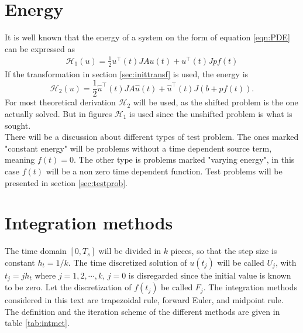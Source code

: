 \section{Energy}%
It is well known that the energy of a system on the form of equation \eqref{eqn:PDE} can be expressed as \cite{energy}
\begin{equation}
\begin{aligned}
\mathcal{H}_1(u) = \frac{1}{2} u^\top (t) J A u(t) + u^\top(t) J p f(t)
\end{aligned}
\end{equation}
If the transformation in section \ref{sec:inittransf} is used, the energy is 
\begin{equation}
\mathcal{H}_2 (u) = \frac{1}{2} \hat{u}^\top (t)  J A \hat{u}(t) + \hat{u}^\top (t)  J (b + p f(t)).
\label{eqn:energy2}
\end{equation}
For most theoretical derivation $\mathcal{H}_2$ will be used, as the shifted problem is the one actually solved. But in figures $\mathcal{H}_1$ is used since the unshifted problem is what is sought. \\

There will be a discussion about different types of test problem. The ones marked "constant energy" will be problems without a time dependent source term, meaning $f(t)= 0$. The other type is problems marked "varying energy", in this case $f(t)$ will be a non zero time dependent function. Test problems will be presented in section \ref{sec:testprob}.

\section{Integration methods}%
The time domain $[0,T_s]$ will be divided in $k$ pieces, so that the step size is constant $h_t = 1/k$. The time discretized solution of $u(t_j)$ will be called $U_j$, with $t_j = j h_t$ where $ j = 1,2,\cdots,k $, $j = 0$ is disregarded since the initial value is known to be zero. Let the discretization of $f(t_j)$ be called $F_j$. The integration methods considered in this text are trapezoidal rule, forward Euler, and midpoint rule. The definition and the iteration scheme of the different methods are given in table \ref{tab:intmet}. \\

